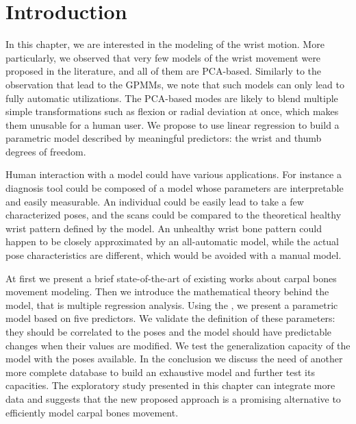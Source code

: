 \section{Introduction}
\label{sec:5_Intro}


In this chapter, we are interested in the modeling of the wrist motion. More particularly, we observed that very few models of the wrist movement were proposed in the literature, and all of them are PCA-based. Similarly to the observation that lead to the GPMMs, we note that such models can only lead to fully automatic utilizations. The PCA-based modes are likely to blend multiple simple transformations  such as flexion or radial deviation at once, which makes them unusable for a human user. We propose to use linear regression to build a parametric model described by meaningful predictors: the wrist and thumb degrees of freedom. 


Human interaction with a model could have various applications. For instance a diagnosis tool could be composed of a model whose parameters are interpretable and easily measurable. An individual could be easily lead to take a few characterized poses, and the scans could be compared to the theoretical healthy wrist pattern defined by the model. An unhealthy wrist bone pattern could happen to be closely approximated by an all-automatic model, while the actual pose characteristics are different, which would be avoided with a manual model. 


At first we present a brief state-of-the-art of existing works about carpal bones movement modeling. Then we introduce the mathematical theory behind the model, that is multiple regression analysis. Using the \db*, we present a parametric model based on five predictors. We validate the definition of these parameters: they should be correlated to the poses and the model should have predictable changes when their values are modified. We test the generalization capacity of the model with the poses available. In the conclusion we discuss the need of another more complete database to build an exhaustive model and further test its capacities. The exploratory study presented in this chapter can integrate more data and suggests that the new proposed approach is a promising alternative to efficiently model carpal bones movement.